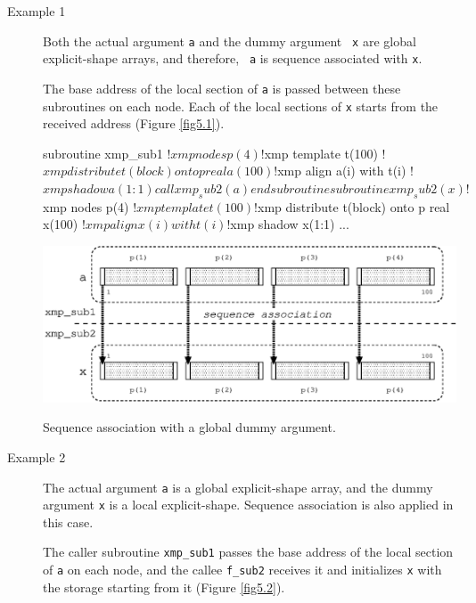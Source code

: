 \begin{description}

\item[Example 1]

	   Both the actual argument {\tt a} and the dummy argument {\tt
	   x} are global explicit-shape arrays, and therefore, {\tt
	   a} is sequence associated with {\tt x}.

	   The base address of the local section of {\tt a} is
	   passed between these subroutines on each node. Each of the local
	   sections of {\tt x} starts from the received address (Figure
	   \ref{fig5.1}).

\begin{XFexample}
      subroutine xmp_sub1
!$xmp nodes p(4)
!$xmp template t(100)
!$xmp distribute t(block) onto p
      real a(100)
!$xmp align a(i) with t(i)
!$xmp shadow a(1:1) 
      call xmp_sub2(a)
      end subroutine

      subroutine xmp_sub2(x)
!$xmp nodes p(4)
!$xmp template t(100)
!$xmp distribute t(block) onto p
      real x(100)
!$xmp align x(i) with t(i)
!$xmp shadow x(1:1) 
      ...
\end{XFexample}

\begin{myfigure}
 \includegraphics[scale=0.7]{figs/fig5.1.eps}
 \caption{Sequence association with a global dummy argument.}
 \label{fig5.1}
\end{myfigure}

\item[Example 2]

	   The actual argument {\tt a} is a global explicit-shape array,
	   and the dummy argument {\tt x} is a local explicit-shape. 
	   Sequence association is also applied in this case.

	   The caller subroutine {\tt xmp\_sub1} passes the base address
	   of the local section of {\tt a} on each node, and the callee
	   {\tt f\_sub2} receives it and initializes {\tt x} with the
	   storage starting from it (Figure \ref{fig5.2}).


\end{description}
